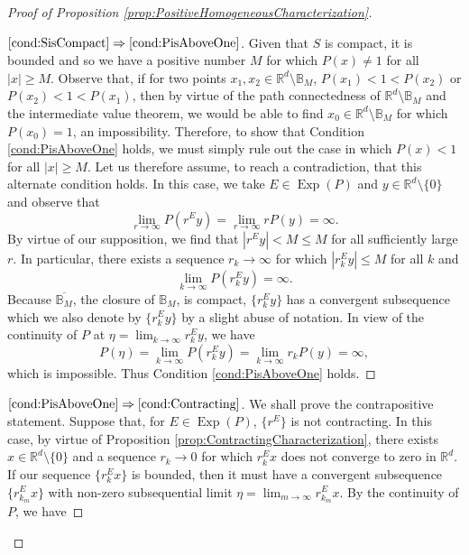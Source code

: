 \documentclass[11pt]{article}
\theoremstyle{remark}
\newcommand*{\myproofname}{Proof}
\newenvironment{subproof}[1][\myproofname]{\begin{proof}[#1]\renewcommand*{\qedsymbol}{$\mathbin{/\mkern-6mu/}$}}{\end{proof}}
\newcommand\Exp{\operatorname{Exp}}
\begin{document}
\begin{proof}[Proof of Proposition \ref{prop:PositiveHomogeneousCharacterization}]
\begin{subproof}[$\ref{cond:SisCompact}\Rightarrow\ref{cond:PisAboveOne}$]
Given that $S$ is compact, it is bounded and so we have a positive number $M$ for which $P(x)\neq 1$ for all $|x|\geq M$. Observe that, if for two points $x_1,x_2\in \mathbb{R}^d\setminus\mathbb{B}_M$, $P(x_1)<1<P(x_2)$ or $P(x_2)<1<P(x_1)$, then by virtue of the path connectedness of $\mathbb{R}^d\setminus\mathbb{B}_M$ and the intermediate value theorem, we would be able to find  $x_0\in\mathbb{R}^d\setminus\mathbb{B}_M$ for which $P(x_0)=1$, an impossibility. Therefore, to show that Condition \ref{cond:PisAboveOne} holds, we must simply rule out the case in which $P(x)<1$ for all $|x|\geq M$. Let us therefore assume, to reach a contradiction, that this alternate condition holds. In this case, we take $E\in\Exp(P)$ and $y\in\mathbb{R}^d\setminus \{0\}$ and observe that
\begin{equation*}
\lim_{r\to\infty}P(r^Ey)=\lim_{r\to\infty}rP(y)=\infty.
\end{equation*}
By virtue of our supposition, we find that $|r^Ey|<M\leq M$ for all sufficiently large $r$. In particular, there exists a sequence $r_k\to\infty$ for which $|r_k^Ey|\leq M$ for all $k$ and 
\begin{equation*}
\lim_{k\to\infty}P(r_k^Ey)=\infty.
\end{equation*}
Because $\overline{\mathbb{B}_M}$, the closure of $\mathbb{B}_M$, is compact, $\{r_k^Ey\}$ has a convergent subsequence which we also denote by $\{r_k^Ey\}$ by a slight abuse of notation. In view of the continuity of $P$ at $\eta=\lim_{k\to\infty}r_k^Ey$, we have
\begin{equation*}
P(\eta)=\lim_{k\to\infty}P(r_k^Ey)=\lim_{k\to\infty}r_kP(y)=\infty,
\end{equation*}
which is impossible. Thus Condition \ref{cond:PisAboveOne} holds.
\end{subproof}
\begin{subproof}[$\ref{cond:PisAboveOne}\Rightarrow\ref{cond:Contracting}$]
We shall prove the contrapositive statement. Suppose that, for $E\in\Exp(P)$, $\{r^E\}$ is not contracting. In this case, by virtue of Proposition \ref{prop:ContractingCharacterization}, there exists $x\in\mathbb{R}^d\setminus\{0\}$ and a sequence $r_k\to 0$ for which $r_k^Ex$ does not converge to zero in $\mathbb{R}^d$. If our sequence $\{r_k^Ex\}$ is bounded, then it must have a convergent subsequence $\{r_{k_m}^Ex\}$ with non-zero subsequential limit $\eta=\lim_{m\to\infty}r_{k_m}^Ex$. By the continuity of $P$, we have

\end{subproof}
\end{proof}
\end{document}
